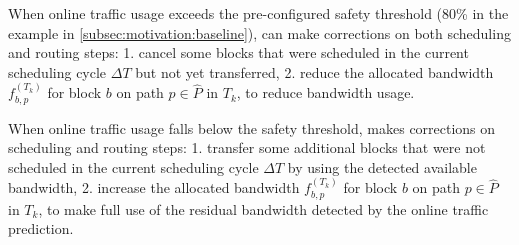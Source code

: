 {\begin{packeditemize}
\item When online traffic usage exceeds the pre-configured safety threshold (80\% in the example in \Section\ref{subsec:motivation:baseline}), \newname can make corrections on both scheduling and routing steps: 1. cancel some blocks that were scheduled in the current scheduling cycle $\Delta T$ but not yet transferred, 2. reduce the allocated bandwidth $f_{b,p}^{(T_k)}$ for block $b$ on path $p\in \hat{P}$ in $T_k$, to reduce bandwidth usage.

\item When online traffic usage falls below the safety threshold, \newname makes corrections on scheduling and routing steps: 1. transfer some additional blocks that were not scheduled in the current scheduling cycle $\Delta T$ by using the detected available bandwidth, 2. increase the allocated bandwidth $f_{b,p}^{(T_k)}$ for block $b$ on path $p\in \hat{P}$ in $T_k$, to make full use of the residual bandwidth detected by the online traffic prediction.
\end{packeditemize}





}
